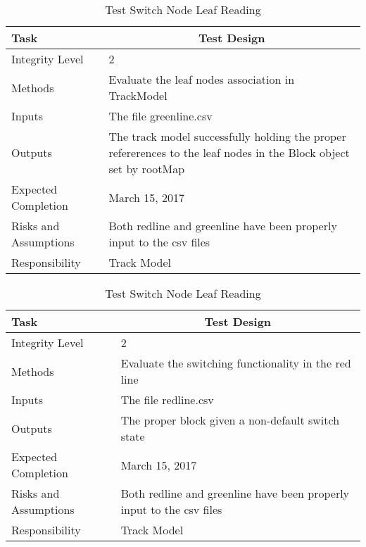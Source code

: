 \documentclass[]{article}
\begin{document}
\begin{table}[H]
	\centering
	\caption{Test Switch Node Leaf Reading}
	\begin{tabular}{|l|l|}
		\hline
		Task & \multicolumn{1}{c|}{Test Design} \\ \hline
		Integrity Level & 2 \\ \hline
		Methods & Evaluate the leaf nodes association in TrackModel\\ \hline
		Inputs &  The file greenline.csv \\ \hline
		Outputs &  \parbox[t]{10cm}{The track model successfully holding the proper refererences to the leaf nodes in the Block object set by rootMap}\\ \hline
		Expected Completion & March 15, 2017\\ \hline
		Risks and Assumptions & Both redline and greenline have been properly input to the csv files \\ \hline
		Responsibility & Track Model\\ \hline
	\end{tabular}
\end{table}

\begin{table}[H]
	\centering
	\caption{Test Switch Node Leaf Reading}
	\begin{tabular}{|l|l|}
		\hline
		Task & \multicolumn{1}{c|}{Test Design} \\ \hline
		Integrity Level & 2 \\ \hline
		Methods & Evaluate the switching functionality in the red line\\ \hline
		Inputs &  The file redline.csv \\ \hline
		Outputs &  The proper  block given a non-default switch state\\ \hline
		Expected Completion & March 15, 2017\\ \hline
		Risks and Assumptions & Both redline and greenline have been properly input to the csv files \\ \hline
		Responsibility & Track Model\\ \hline
	\end{tabular}
\end{table}
\end{document}
